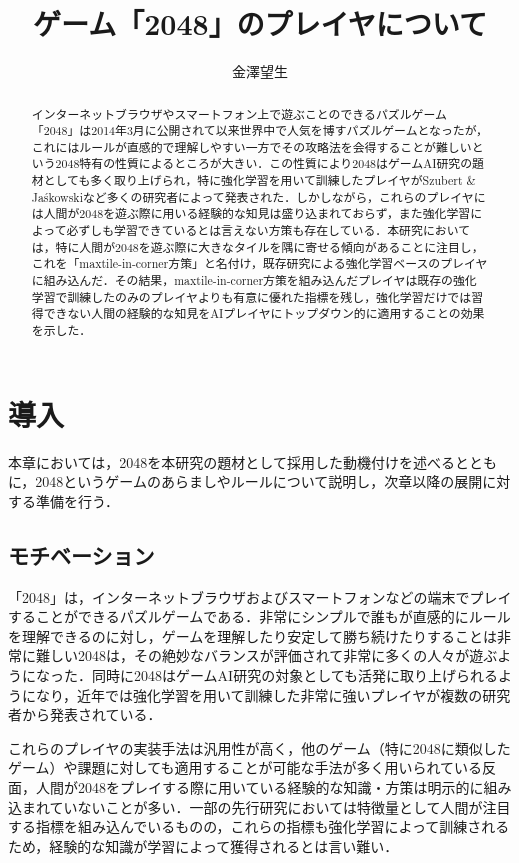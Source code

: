 \documentclass{suribt}
\title{ゲーム「2048」のプレイヤについて}
\author{金澤望生}
\begin{document}
\maketitle

\frontmatter
\begin{abstract}
インターネットブラウザやスマートフォン上で遊ぶことのできるパズルゲーム「2048」は2014年3月に公開されて以来世界中で人気を博すパズルゲームとなったが，これにはルールが直感的で理解しやすい一方でその攻略法を会得することが難しいという2048特有の性質によるところが大きい．この性質により2048はゲームAI研究の題材としても多く取り上げられ，特に強化学習を用いて訓練したプレイヤがSzubert \& Ja\'{s}kowskiなど多くの研究者によって発表された．しかしながら，これらのプレイヤには人間が2048を遊ぶ際に用いる経験的な知見は盛り込まれておらず，また強化学習によって必ずしも学習できているとは言えない方策も存在している．本研究においては，特に人間が2048を遊ぶ際に大きなタイルを隅に寄せる傾向があることに注目し，これを「maxtile-in-corner方策」と名付け，既存研究による強化学習ベースのプレイヤに組み込んだ．その結果，maxtile-in-corner方策を組み込んだプレイヤは既存の強化学習で訓練したのみのプレイヤよりも有意に優れた指標を残し，強化学習だけでは習得できない人間の経験的な知見をAIプレイヤにトップダウン的に適用することの効果を示した．
\end{abstract}

\tableofcontents

\mainmatter
\chapter{導入}
本章においては，2048を本研究の題材として採用した動機付けを述べるとともに，2048というゲームのあらましやルールについて説明し，次章以降の展開に対する準備を行う．

\section{モチベーション}
「2048」\cite{2048game}は，インターネットブラウザおよびスマートフォンなどの端末でプレイすることができるパズルゲームである．非常にシンプルで誰もが直感的にルールを理解できるのに対し，ゲームを理解したり安定して勝ち続けたりすることは非常に難しい\cite{Szubert}2048は，その絶妙なバランスが評価されて非常に多くの人々が遊ぶようになった．同時に2048はゲームAI研究の対象としても活発に取り上げられるようになり，近年では強化学習を用いて訓練した非常に強いプレイヤが複数の研究者から発表されている．\cite{Szubert}\cite{Wu}\cite{Oka}\cite{Yeh}\cite{Jaskowski}

これらのプレイヤの実装手法は汎用性が高く，他のゲーム（特に2048に類似したゲーム）や課題に対しても適用することが可能な手法が多く用いられている\cite{Yeh}反面，人間が2048をプレイする際に用いている経験的な知識・方策は明示的に組み込まれていないことが多い．一部の先行研究においては特徴量として人間が注目する指標を組み込んでいる\cite{Yeh}ものの，これらの指標も強化学習によって訓練されるため，経験的な知識が学習によって獲得されるとは言い難い．
\end{document}
